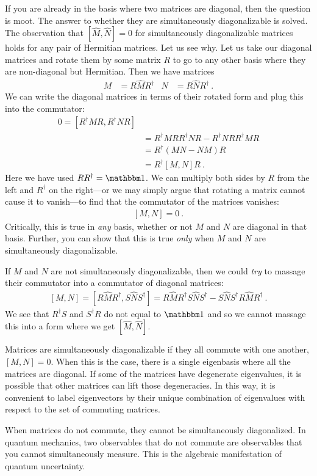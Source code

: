 \documentclass[12pt, oneside]{report}    %
\begin{document}
If you are already in the basis where two matrices are diagonal, then the question is moot. The answer to whether they are simultaneously diagonalizable is solved. The observation that $[\hat M,\hat N] =0 $ for simultaneously diagonalizable matrices holds for any pair of Hermitian matrices. Let us see why. Let us take our diagonal matrices and rotate them by some matrix $R$ to go to any other basis where they are non-diagonal but Hermitian. Then we have matrices
\begin{align}
    M &= R \hat M R^\dag
    &
    N &= R \hat N R^\dag \ .
\end{align}
We can write the diagonal matrices in terms of their rotated form and plug this into the commutator:
\begin{align}
    0=
    \left[ R^\dag M R, R^\dag N R  \right] 
    \\&= 
    R^\dag M R R^\dag N R
    -
    R^\dag N R R^\dag M R
    \\&=
    R^\dag(MN - NM)R
    \\&= R^\dag \left[M,N\right] R \ .
\end{align}
Here we have used $RR^\dag =\one$. We can multiply both sides by $R$ from the left and $R^\dag$ on the right---or we may simply argue that rotating a matrix cannot cause it to vanish---to find that the commutator of the matrices vanishes:
\begin{align}
    \left[M,N\right] = 0 \ .
\end{align}
Critically, this is true in \emph{any} basis, whether or not $M$ and $N$ are diagonal in that basis. Further, you can show that this is true \emph{only} when $M$ and $N$ are simultaneously diagonalizable. 

If $M$ and $N$ are not simultaneously diagonalizable, then we could \emph{try} to massage their commutator into a commutator of diagonal matrices:
\begin{align}
    \left[M,N\right] = 
    \left[R\hat M R^\dag, S\hat N S^\dag\right]
    =
    R \hat M R^\dag S \hat N S^\dag
    -
    S \hat N S^\dag    R \hat M R^\dag  \ .
\end{align}
We see that $R^\dag S$ and $S^\dag R$ do not equal to $\one$ and so we cannot massage this into a form where we get $[\hat M, \hat N]$. 

\begin{bigidea}
Matrices are simultaneously diagonalizable if they all commute with one another, $[M,N] = 0$. When this is the case, there is a single eigenbasis where all the matrices are diagonal. If some of the matrices have degenerate eigenvalues, it is possible that other matrices can lift those degeneracies. In this way, it is convenient to label eigenvectors by their unique combination of eigenvalues with respect to the set of commuting matrices. 

When matrices do not commute, they cannot be simultaneously diagonalized. In quantum mechanics, two observables that do not commute are observables that you cannot simultaneously measure. This is the algebraic manifestation of quantum uncertainty.
\end{bigidea}
\end{document}
